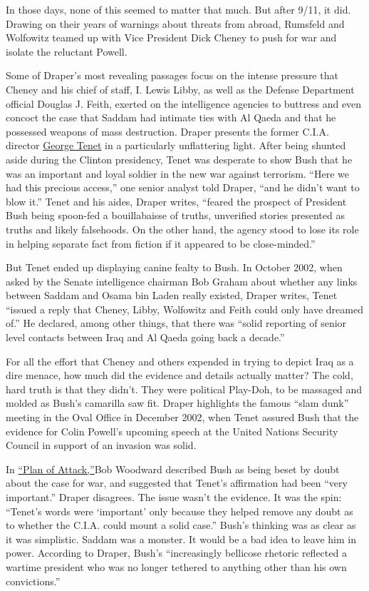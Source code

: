 In those days, none of this seemed to matter that much. But after 9/11,
it did. Drawing on their years of warnings about threats from abroad,
Rumsfeld and Wolfowitz teamed up with Vice President Dick Cheney to push
for war and isolate the reluctant Powell.

Some of Draper's most revealing passages focus on the intense pressure
that Cheney and his chief of staff, I. Lewis Libby, as well as the
Defense Department official Douglas J. Feith, exerted on the
intelligence agencies to buttress and even concoct the case that Saddam
had intimate ties with Al Qaeda and that he possessed weapons of mass
destruction. Draper presents the former C.I.A. director
\href{https://www.cnn.com/2013/08/06/us/george-tenet-fast-facts/index.html}{George
Tenet} in a particularly unflattering light. After being shunted aside
during the Clinton presidency, Tenet was desperate to show Bush that he
was an important and loyal soldier in the new war against terrorism.
``Here we had this precious access,'' one senior analyst told Draper,
``and he didn't want to blow it.'' Tenet and his aides, Draper writes,
``feared the prospect of President Bush being spoon-fed a bouillabaisse
of truths, unverified stories presented as truths and likely falsehoods.
On the other hand, the agency stood to lose its role in helping separate
fact from fiction if it appeared to be close-minded.''

But Tenet ended up displaying canine fealty to Bush. In October 2002,
when asked by the Senate intelligence chairman Bob Graham about whether
any links between Saddam and Osama bin Laden really existed, Draper
writes, Tenet ``issued a reply that Cheney, Libby, Wolfowitz and Feith
could only have dreamed of.'' He declared, among other things, that
there was ``solid reporting of senior level contacts between Iraq and Al
Qaeda going back a decade.''

For all the effort that Cheney and others expended in trying to depict
Iraq as a dire menace, how much did the evidence and details actually
matter? The cold, hard truth is that they didn't. They were political
Play-Doh, to be massaged and molded as Bush's camarilla saw fit. Draper
highlights the famous ``slam dunk'' meeting in the Oval Office in
December 2002, when Tenet assured Bush that the evidence for Colin
Powell's upcoming speech at the United Nations Security Council in
support of an invasion was solid.

In
\href{https://www.nytimes.com/2004/04/28/books/review/plan-of-attack-all-the-presidents-mentors.html}{``Plan
of Attack,''}Bob Woodward described Bush as being beset by doubt about
the case for war, and suggested that Tenet's affirmation had been ``very
important.'' Draper disagrees. The issue wasn't the evidence. It was the
spin: ``Tenet's words were `important' only because they helped remove
any doubt as to whether the C.I.A. could mount a solid case.'' Bush's
thinking was as clear as it was simplistic. Saddam was a monster. It
would be a bad idea to leave him in power. According to Draper, Bush's
``increasingly bellicose rhetoric reflected a wartime president who was
no longer tethered to anything other than his own convictions.''

